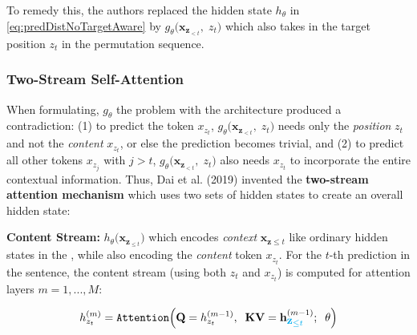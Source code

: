 To remedy this, the authors replaced the hidden state $h_\theta$ in \cref{eq:predDistNoTargetAware} by $g_\theta \Big( \textbf{x}_{\textbf{z}_{< t}}, \; z_t \Big)$ which also takes in the target position $z_t$ in the permutation sequence. 




\subsubsection{Two-Stream Self-Attention }\label{sec:TwoStreamSelfAttention}

When formulating, $g_\theta$ the problem with the  architecture produced a contradiction: (1) to predict the token $x_{z_t}$, $g_\theta \Big( \textbf{x}_{\textbf{z}_{< t}}, \; z_t \Big)$ needs only the \emph{position} $z_t$ and not the \emph{content} $x_{z_t}$, or else the prediction becomes trivial, and (2) to predict all other tokens $x_{z_j}$ with $j > t$,  $g_\theta \Big( \textbf{x}_{\textbf{z}_{< t}}, \; z_t \Big)$ also needs $x_{z_t}$ to incorporate the entire contextual information. Thus, Dai et al. (2019) invented the \textbf{two-stream attention mechanism} which uses two sets of hidden states to create an overall hidden state:


\textbf{Content Stream: } $h_\theta \Big( \textbf{x}_{\textbf{z}_{\leq t}} \Big)$ which encodes \emph{context} $\textbf{x}_{\textbf{z} \leq t}$ like ordinary hidden states in the , while also encoding the \emph{content} token $x_{z_t}$. For the $t$-th prediction in the sentence, the content stream (using both $z_t$ and $x_{z_t}$) is computed for attention layers $m = 1, ..., M$:

\begin{equation}\label{eq:ContentStrmCalc}
    h_{z_t}^{(m)} = \texttt{Attention} \Big( \textbf{Q} = h_{z_t}^{(m-1)}, \;\; \textbf{KV} = \textbf{h}_{ {\color{cyan} \mathlarger{\mathlarger{\mathbf{z}_{\leq t}}}  } }^{(m-1)}; \;\; \theta  \Big)
\end{equation}

%     
%     


